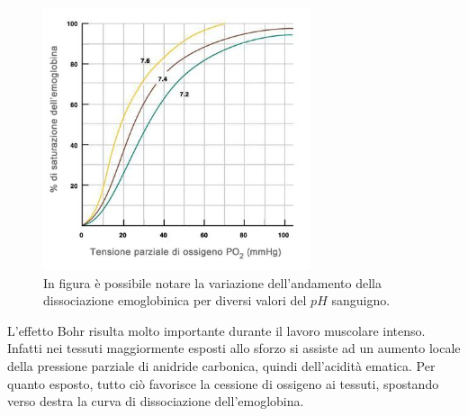 \documentclass[a4paper, 12pt]{book}
\begin{document}
\begin{figure}[h!]
    \centering
    \includegraphics[width=0.7\textwidth]{emoglobina-pH.jpeg}
    \caption{In figura è possibile notare la variazione dell'andamento della 							 dissociazione emoglobinica per diversi valori del $pH$ sanguigno.}
    \label{fig:pH}
\end{figure}
L'effetto Bohr risulta molto importante durante il lavoro muscolare intenso.
Infatti nei tessuti maggiormente esposti allo sforzo si assiste ad un aumento locale della pressione parziale di anidride carbonica, quindi dell'acidità ematica.
Per quanto esposto, tutto ciò favorisce la cessione di ossigeno ai tessuti, spostando verso destra la curva di dissociazione dell'emoglobina.
\newline
\end{document}
